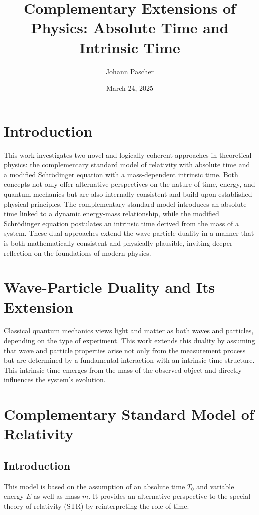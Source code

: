 \documentclass[a4paper,12pt]{article}
\begin{document}
	
	\title{Complementary Extensions of Physics: Absolute Time and Intrinsic Time}
	\author{Johann Pascher} %
	\date{March 24, 2025}
	\maketitle
	
	\tableofcontents %
	\newpage %
	
	\section{Introduction}
	This work investigates two novel and logically coherent approaches in theoretical physics: the complementary standard model of relativity with absolute time and a modified Schrödinger equation with a mass-dependent intrinsic time. Both concepts not only offer alternative perspectives on the nature of time, energy, and quantum mechanics but are also internally consistent and build upon established physical principles. The complementary standard model introduces an absolute time linked to a dynamic energy-mass relationship, while the modified Schrödinger equation postulates an intrinsic time derived from the mass of a system. These dual approaches extend the wave-particle duality in a manner that is both mathematically consistent and physically plausible, inviting deeper reflection on the foundations of modern physics.
	
	\section{Wave-Particle Duality and Its Extension}
	Classical quantum mechanics views light and matter as both waves and particles, depending on the type of experiment. This work extends this duality by assuming that wave and particle properties arise not only from the measurement process but are determined by a fundamental interaction with an intrinsic time structure. This intrinsic time emerges from the mass of the observed object and directly influences the system's evolution.
	
	\section{Complementary Standard Model of Relativity}
	
	\subsection{Introduction}
	This model is based on the assumption of an absolute time \( T_0 \) and variable energy \( E \) as well as mass \( m \). It provides an alternative perspective to the special theory of relativity (STR) by reinterpreting the role of time.
	
\end{document}
